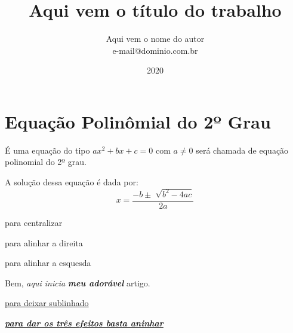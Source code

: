 \documentclass[a4paper,12pt]{article}
\title{Aqui vem o título do trabalho}
\author{Aqui vem o nome do autor \\ e-mail@dominio.com.br}
\date{2020}
\begin{document}
   \maketitle
   \newpage
   \tableofcontents \newpage %
   \listoffigures
   \listoftables

   \section{Equação Polinômial do 2º Grau}
     É uma equação do tipo $ax^2+bx+c=0$ com $a\neq 0$ será chamada de        equação polinomial do 2º grau.

   A solução dessa equação é dada por: $$x=\frac{-b\pm\sqrt[]{b^2-4ac}}{2a}$$

   \begin{center}
   para centralizar 
   \end{center}
   \begin{flushright}
   para alinhar a direita
   \end{flushright}
   \begin{flushleft}
   para alinhar a esquesda
   \end{flushleft}

   Bem, \textit{aqui inicia} \textit{\textbf{meu adorável}} artigo.

   \underline{para deixar sublinhado}

   \textbf{\textit{\underline{para dar os três efeitos basta aninhar}}}
\end{document}
